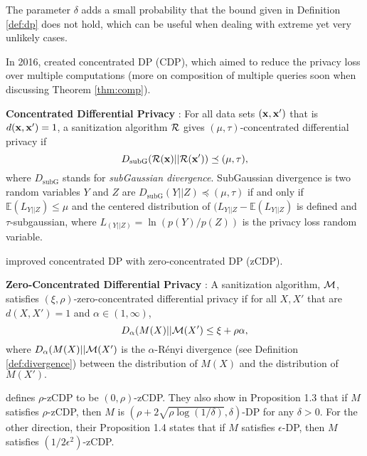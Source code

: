 The parameter $\delta$ adds a small probability that the bound given in Definition \ref{def:dp} does not hold, which can be useful when dealing with extreme yet very unlikely cases.

In 2016, \citet{dwork2016concentrated} created concentrated DP (CDP), which aimed to reduce the privacy loss over multiple computations (more on composition of multiple queries soon when discussing Theorem \ref{thm:comp}).

\begin{defn}\label{def:cdp} \textbf{Concentrated Differential Privacy} \citep{dwork2016concentrated}:
For all data sets $(\mathbf{x},\mathbf{x}')$ that is $d(\mathbf{x},\mathbf{x}')=1$, a sanitization algorithm $\mathcal{R}$ gives $(\mu, \tau)$-concentrated differential privacy if 
\begin{equation}
    D_{\text{subG}}(\mathcal{R}(\mathbf{x})||\mathcal{R}(\mathbf{x}')) \preceq (\mu,\tau),
\end{equation}
where $D_{\text{subG}}$ stands for \emph{subGaussian divergence}. SubGaussian divergence is two random variables $Y$ and $Z$ are $D_{\text{subG}}(Y||Z) \preceq (\mu,\tau)$ if and only if  $\mathbb{E}(L_{Y||Z})\leq \mu$ and the centered distribution of $(L_{Y||Z}-\mathbb{E}(L_{Y||Z})$ is defined and $\tau$-subgaussian, where  $L_{(Y||Z)}=\ln\left(p(Y) /p(Z) \right)$ is the privacy loss random variable.
\end{defn}

\citet{bun2016concentrated} improved concentrated DP with zero-concentrated DP (zCDP).

\begin{defn}\label{def:scdp} \textbf{Zero-Concentrated Differential Privacy} \citep{bun2016concentrated}:
A sanitization algorithm, $\mathcal{M}$, satisfies $(\xi, \rho)$-zero-concentrated differential privacy if for all $X, X'$ that are $d(X,X')=1$ and $\alpha\in (1, \infty)$,
    \begin{equation}
        D_\alpha(M(X)||\mathcal{M}(X')\leq\xi+\rho\alpha,
    \end{equation}
    where $D_\alpha(M(X)||\mathcal{M}(X')$ is the $\alpha$-R\'enyi divergence (see Definition \ref{def:divergence}) between the distribution of $M(X)$ and the distribution of $M(X').$
\end{defn}
\citet{bun2016concentrated} defines $\rho$-zCDP to be $(0,\rho)$-zCDP. They also show in Proposition 1.3 that if $M$ satisfies $\rho$-zCDP, then $M$ is $(\rho+2\sqrt{\rho\log(1/\delta)},\delta)$-DP for any $\delta>0$. For the other direction, their Proposition 1.4 states that if $M$ satisfies $\epsilon$-DP, then $M$ satisfies $(1/2\epsilon^2)$-zCDP.

